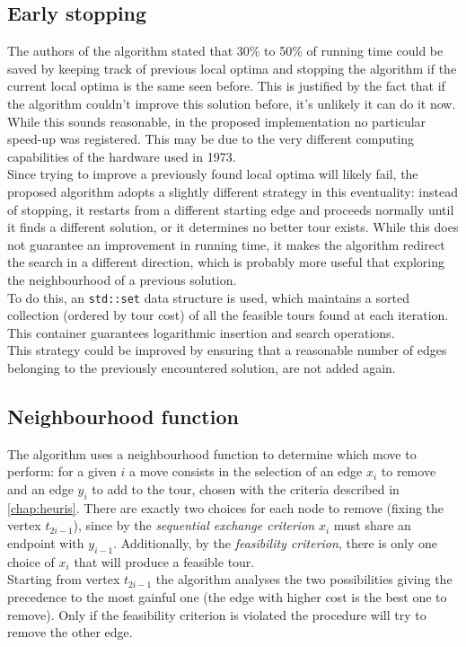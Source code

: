 \subsection{Early stopping}
The authors of the algorithm stated that 30\% to 50\% of running time could be saved by keeping track of previous local optima and stopping the algorithm if the current local optima is the same seen before. This is justified by the fact that if the algorithm couldn't improve this solution before, it's unlikely it can do it now. While this sounds reasonable, in the proposed implementation no particular speed-up was registered. This may be due to the very different computing capabilities of the hardware used in 1973.\\
Since trying to improve a previously found local optima will likely fail, the proposed algorithm adopts a slightly different strategy in this eventuality: instead of stopping, it restarts from a different starting edge and proceeds normally until it finds a different solution, or it determines no better tour exists. While this does not guarantee an improvement in running time, it makes the algorithm redirect the search in a different direction, which is probably more useful that exploring the neighbourhood of a previous solution.\\
To do this, an \texttt{std::set} data structure is used, which maintains a sorted collection (ordered by tour cost) of all the feasible tours found at each iteration. This container guarantees logarithmic insertion and search operations.\\
This strategy could be improved by ensuring that a reasonable number of edges belonging to the previously encountered solution, are not added again.

\subsection{Neighbourhood function}
The algorithm uses a neighbourhood function to determine which move to perform: for a given $i$ a move consists in the selection of an edge $x_i$ to remove and an edge $y_i$ to add to the tour, chosen with the criteria described in \cref{chap:heuris}.
There are exactly two choices for each node to remove (fixing the vertex $t_{2i-1}$), since by the \emph{sequential exchange criterion} $x_i$ must share an endpoint with $y_{i-1}$. Additionally, by the \emph{feasibility criterion}, there is only one choice of $x_i$ that will produce a feasible tour.\\
Starting from vertex $t_{2i-1}$ the algorithm analyses the two possibilities giving the precedence to the most gainful one (the edge with higher cost is the best one to remove). Only if the feasibility criterion is violated the procedure will try to remove the other edge.\\

